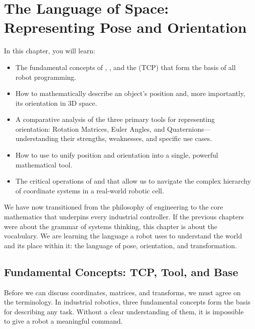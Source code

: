 \chapter{The Language of Space: Representing Pose and Orientation}
\label{ch:math_foundation}

\begin{navigationbox}{In this chapter, you will learn:}
    \begin{itemize}
        \item The fundamental concepts of , , and the  (TCP) that form the basis of all robot programming.
        \item How to mathematically describe an object's position and, more importantly, its orientation in 3D space.
        \item A comparative analysis of the three primary tools for representing orientation: Rotation Matrices, Euler Angles, and Quaternions—understanding their strengths, weaknesses, and specific use cases.
        \item How to use  to unify position and orientation into a single, powerful mathematical tool.
        \item The critical operations of  and  that allow us to navigate the complex hierarchy of coordinate systems in a real-world robotic cell.
    \end{itemize}
\end{navigationbox}

We have now transitioned from the philosophy of engineering to the core mathematics that underpins every industrial controller. If the previous chapters were about the grammar of systems thinking, this chapter is about the vocabulary. We are learning the language a robot uses to understand the world and its place within it: the language of pose, orientation, and transformation.

\section{Fundamental Concepts: TCP, Tool, and Base}

Before we can discuss coordinates, matrices, and transforms, we must agree on the terminology. In industrial robotics, three fundamental concepts form the basis for describing any task. Without a clear understanding of them, it is impossible to give a robot a meaningful command.

